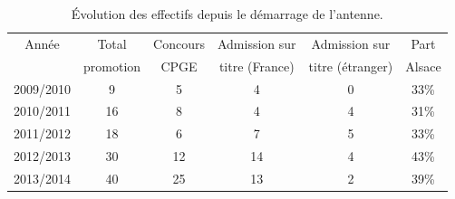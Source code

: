 \documentclass[11pt]{article}
\begin{document}
\begin{centering}
\begin{table}[hbt]
\begin{center}
\begin{tabular}{|c|c|c|c|c|c|}
\hline
Année &	Total &  Concours & Admission sur  &	Admission sur  & 	Part  \\
      & promotion &  CPGE & titre (France) &     titre (étranger)&     Alsace \\
\hline
2009/2010	& 9	& 5	& 4	& 0	    & 33\% \\
2010/2011	& 16	& 8	& 4	& 4	    & 31\% \\
2011/2012	& 18	& 6	& 7	& 5	    & 33\% \\
2012/2013	& 30	& 12	& 14	& 4	    & 43\% \\ 
2013/2014	& 40	& 25    & 13	& 2	    & 39\% \\
\hline
\hline
\end{tabular}
\end{center}
\caption{Évolution des effectifs depuis le démarrage de l'antenne.}
\label{tab:effectifs}
\end{table}
\end{centering}
\end{document}
